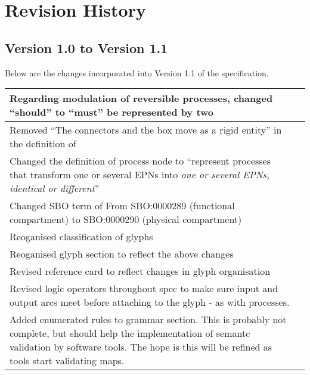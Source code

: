 \chapter{Revision History}

\section{Version 1.0 to Version 1.1}

Below are the changes incorporated into Version 1.1 of the \SBGNPDLone specification.

\begin{center}
\label{tab:revision history 1.1}
\tablelasttail{\hline}
\begin{supertabular}{|p{12cm}|c|}\hline
Regarding modulation of reversible processes, changed ``should'' to ``must'' be represented by two  & \\\hline
Removed ``The connectors and the box move as a rigid entity'' in the definition of  & \\\hline
Changed the definition of process node to ``represent processes that transform one or several EPNs into \emph{one or several EPNs, identical or different}''& \\\hline
Changed SBO term of  From SBO:0000289 (functional compartment) to SBO:0000290 (physical compartment) & \\\hline
Reoganised classification of glyphs & \\\hline
Reoganised glyph section to reflect the above changes & \\\hline
Revised reference card to reflect changes in glyph organisation &
\\\hline
Revised logic operators throughout spec to make sure input and output
arcs meet before attaching to the glyph - as with processes. &
\\\hline
Added enumerated rules to grammar section. This is probably not
complete, but should help the implementation of semantc validation by
software tools. The hope is this will be refined as tools start
validating maps. & \\\hline

\end{supertabular}
\end{center}
